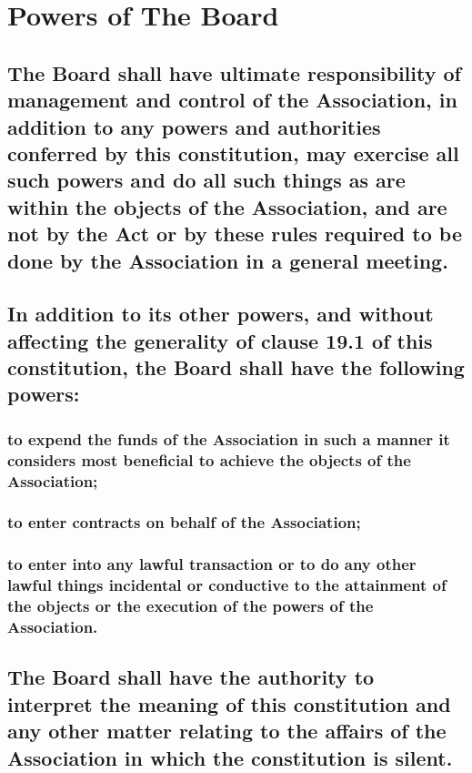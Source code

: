 \documentclass{article}
\newenvironment{subs}
  {\adjustwidth{2em}{0pt}}
  {\endadjustwidth}
\begin{document}
\section{Powers of The Board}
\begin{subs}
\subsection{The Board shall have ultimate responsibility of management and control of the Association, in addition to any powers and authorities conferred by this constitution, may exercise all such powers and do all such things as are within the objects of the Association, and are not by the Act or by these rules required to be done by the Association in a general meeting.}
\subsection{In addition to its other powers, and without affecting the generality of clause 19.1 of this constitution, the Board shall have the following powers:}
\begin{subs}
\subsubsection{to expend the funds of the Association in such a manner it considers most beneficial to achieve the objects of the Association;}
\subsubsection{to enter contracts on behalf of the Association;}
\subsubsection{to enter into any lawful transaction or to do any other lawful things incidental or conductive to the attainment of the objects or the execution of the powers of the Association.}
\subsection{The Board shall have the authority to interpret the meaning of this constitution and any other matter relating to the affairs of the Association in which the constitution is silent.}
\end{subs}
\end{subs}
\end{document}

